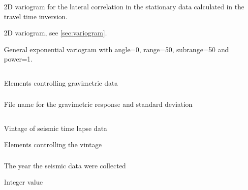 \subsubsection{}
 \slist
   \item \Description 2D variogram for the lateral correlation in the stationary data calculated in the travel time inversion.
   \item \Argument 2D variogram, see \autoref{sec:variogram}.
   \item \Default General exponential variogram with angle=0, range=50, subrange=50 and power=1.
 \elist

\subsection{}
 \slist
\item \Description Elements controlling gravimetric data
   \item \Argument
   \item \Default
 \elist

\subsubsection{}
 \slist
   \item \Description File name for the gravimetric response and standard deviation
   \item \Argument
   \item \Default
 \elist

\subsection{}
 \slist
   \item \Description Vintage of seismic time lapse data
   \item \Argument Elements controlling the vintage
   \item \Default
 \elist

 \subsubsection{}
 \slist
   \item \Description The year the seismic data were collected
   \item \Argument Integer value
   \item \Default
 \elist

